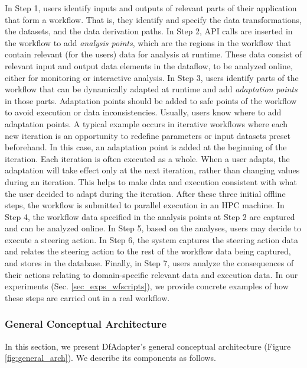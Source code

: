 

In Step 1, users identify inputs and outputs of relevant parts of their application
that form a workflow. That is, they identify and specify the data transformations, the datasets, and the data derivation paths.
In Step 2, API calls are inserted in the workflow to add \textit{analysis points}, which are the regions in the workflow
that contain relevant (for the users) data for analysis at runtime.
These data consist of relevant input and output data elements in the dataflow, to be analyzed online, either for monitoring or interactive analysis.
In Step 3, users identify parts of the workflow that can be dynamically adapted at runtime and add \textit{adaptation points} in those parts.
    Adaptation points should be added to safe points of the workflow to avoid execution or data inconsistencies.
    Usually, users know where to add adaptation points.
    A typical example occurs in iterative workflows where each new iteration is an opportunity to redefine parameters or input datasets preset beforehand. In this case, an adaptation point is added at the beginning of the iteration. Each iteration is often executed as a whole. When a user adapts, the adaptation will take effect only at the next iteration, rather than changing values during an iteration. This helps to make data and execution consistent with what the user decided to adapt during the iteration.
    After these three initial offline steps, the workflow is submitted to parallel execution in an HPC machine.
In Step 4, the workflow data specified in the analysis points at Step 2 are captured and can be analyzed online.
In Step 5, based on the analyses, users may decide to execute a steering action.
In Step 6, the system captures the steering action data and relates the steering action to the rest of the workflow data being captured, and stores in the database.
Finally, in Step 7, users analyze the consequences of their actions relating to domain-specific relevant data and execution data.
In our experiments (Sec. \ref{sec_exps_wfscripts}), we provide concrete examples of how these steps are carried out in a real workflow.

\subsubsection{General Conceptual Architecture}

In this section, we present DfAdapter's general conceptual architecture (Figure \ref{fig:general_arch}). We describe its components as follows.

